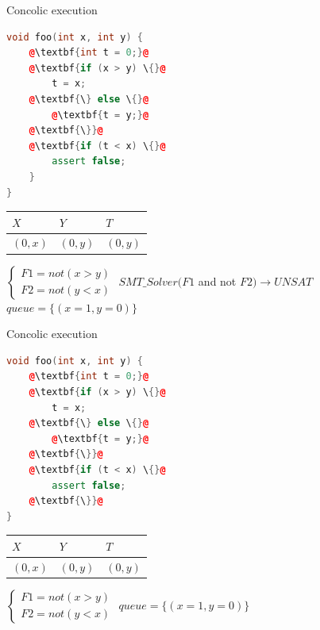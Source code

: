 \documentclass{beamer}
\begin{document}
\begin{frame}[fragile]{Concolic execution}
\begin{minipage}{0.49\textwidth}
\begin{lstlisting}[language=C++,escapechar=@]
void foo(int x, int y) {
    @\textbf{int t = 0;}@
    @\textbf{if (x > y) \{}@
        t = x;
    @\textbf{\} else \{}@
        @\textbf{t = y;}@
    @\textbf{\}}@
    @\textbf{if (t < x) \{}@
        assert false;
    }
}
\end{lstlisting}
\end{minipage}
\hfill
\begin{minipage}{0.49\textwidth}
\begin{center}
\begin{tabular}{ | l | l | l | }
\hline
$X$ & $Y$ & $T$ \\
\hline
$(0, x)$ & $(0, y)$ & $(0, y)$ \\
\hline
\end{tabular}
$\left\{
\begin{array}{l}
F1 = not (x > y) \\
F2 = not (y < x)
\end{array}
\right.$
$SMT\_Solver(F1$ and not $F2) \to UNSAT$
$queue = \{(x = 1, y = 0)\}$
\end{center}
\end{minipage}
\end{frame}

\begin{frame}[fragile]{Concolic execution}
\begin{minipage}{0.49\textwidth}
\begin{lstlisting}[language=C++,escapechar=@]
void foo(int x, int y) {
    @\textbf{int t = 0;}@
    @\textbf{if (x > y) \{}@
        t = x;
    @\textbf{\} else \{}@
        @\textbf{t = y;}@
    @\textbf{\}}@
    @\textbf{if (t < x) \{}@
        assert false;
    @\textbf{\}}@
}
\end{lstlisting}
\end{minipage}
\hfill
\begin{minipage}{0.49\textwidth}
\begin{center}
\begin{tabular}{ | l | l | l | }
\hline
$X$ & $Y$ & $T$ \\
\hline
$(0, x)$ & $(0, y)$ & $(0, y)$ \\
\hline
\end{tabular}
$\left\{
\begin{array}{l}
F1 = not (x > y) \\
F2 = not (y < x)
\end{array}
\right.$
$queue = \{(x = 1, y = 0)\}$
\end{center}
\end{minipage}
\end{frame}
\end{document}
